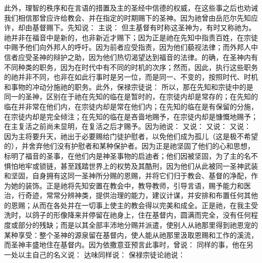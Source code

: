 此外，理智的秩序和在言语的措置及主的圣经中信德的权威，在这些事之后也劝诫我们相信那曾应许给教会、并在指定的时期赐下的圣神。因为祂曾由岳厄尔先知应许，却由基督赐下。先知说： 主说： 但主基督有时称这圣神为，有时又称祂为。祂并非在福音中是新的，也非新近才赐下；因为正是祂在先知中指责百姓，在宗徒中赐予他们向外邦人的呼吁。因为前者应受指责，因为他们藐视法律；而外邦人中信者应受圣神的辩护之助，因为他们热切渴望达到福音的法律。的确，在圣神内有不同种类的职务，因为在时代中有不同的时机的次序；然而，因此，执行这些职务的祂并非不同，也非在如此行事时是另一位，而是同一、不变的，按照时代、时机和事物的冲动分施祂的职务。此外，保禄宗徒说： 所以，那在先知和宗徒中的是同一的圣神，区别在于祂在先知的临在是暂时的，在宗徒内却是常存的；在先知的临在并非常在他们内，在宗徒内却是常在他们内；在先知的临在是有保留的分施，在宗徒内却是完全倾注；在先知的临在是吝啬地赐予，在宗徒内却是慷慨地赐予；在主复活之前尚未显明，在复活之后才赐予。因为祂说： 又说： 又说： 又说： 因为主将要升天，祂出于必要赐给门徒护慰者，以免他们成为孤儿（这是极不希望的），并舍弃他们没有护慰者和某种保护者。因为正是祂坚固了他们的心和思想，标明了福音的圣事，在他们内是神圣事物的启迪者；他们因被坚固，为了主的名不惧怕地牢或锁链，甚至践踏世界上的权势及其酷刑，因为他们从此被同一圣神武装和坚固，自身拥有这同一圣神所分赐的恩赐，并将它们归于教会、基督的净配，作为她的装饰。正是祂将先知安置在教会中，教导教师，引导言语，赐予能力和医治，行奇迹，常常分辨神类，提供治理的能力，建议计谋，并安排和布置任何其他的恩赐；从而在各处并在一切事上使主的教会得以完美和成全。正是祂，在我主受洗时，以鸽子的形像降来并停留在祂身上，住在基督内，圆满而完全，没有任何程度或部分的残缺；而是以其全部丰沛地分赐并派遣，使别人从祂那里得到祂恩宠的某种享受：整个圣神的源泉留在基督内，使人能从祂那里汲取恩赐和工作的溪流，而圣神丰盛地住在基督内。因为依撒意亚预言此事时，曾说： 同样的事，他在另一处以主自己的名义说： 达味同样说： 保禄宗徒论祂说：  